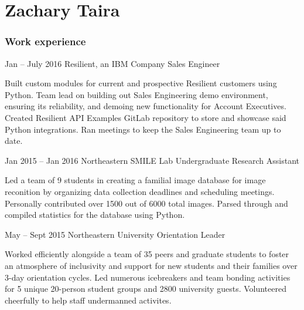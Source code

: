 \documentclass{tccv}
\begin{document}
\part{Zachary Taira}

\section{Work experience}

\begin{eventlist}

\item{Jan -- July 2016}
     {Resilient, an IBM Company}
     {Sales Engineer}

Built custom modules for current and prospective Resilient customers using
Python. Team lead on building out Sales Engineering demo environment,
ensuring its reliability, and demoing new functionality for Account Executives.
Created Resilient API Examples GitLab repository to store and showcase
said Python integrations. Ran meetings to keep the Sales Engineering
team up to date.

\item{Jan 2015 -- Jan 2016}
     {Northeastern SMILE Lab}
     {Undergraduate Research Assistant}

Led a team of 9 students in creating a familial image database for image
reconition by organizing data collection deadlines and scheduling meetings.
Personally contributed over 1500 out of 6000 total images. Parsed through and
compiled statistics for the database using Python. 

\item{May -- Sept 2015}
     {Northeastern University}
     {Orientation Leader}

Worked efficiently alongside a team of 35 peers and graduate students to
foster an atmosphere of inclusivity and support for new students and their
families over 3-day orientation cycles. Led numerous icebreakers and team
bonding activities for 5 unique 20-person student groups and 2800 university
guests. Volunteered cheerfully to help staff undermanned activites.
\end{eventlist}
\end{document}
